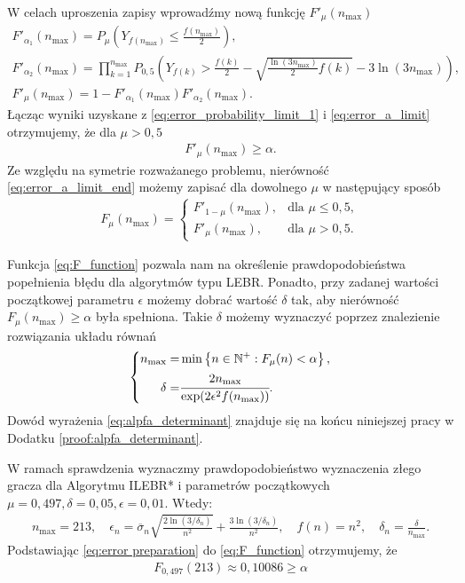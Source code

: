 \documentclass[inzynierska]{pwr_wmat_praca_dyplomowa}
\theoremstyle{plain}
\numberwithin{theorem}{chapter}
\theoremstyle{definition}
\numberwithin{theorem}{chapter}
\newcommand{\nmax}{n_{\text{max}}}
\begin{document}
	W celach uproszenia zapisy wprowadźmy nową funkcję  $F'_{\mu}(\nmax)$
	\begin{gather}
		F'_{\alpha_1}(\nmax) = P_{\mu}\left( Y_{f(\nmax)}  \le \frac{f(\nmax)}{2} \right), \\
		F'_{\alpha_2}(\nmax) = \prod_{k=1}^{\nmax} P_{0,5}\left( Y_{f(k)}  > \frac{f(k)}{2} - \sqrt{\frac{\ln(3\nmax)}{2}f(k)} - 3  \ln{(3 \nmax)}\right), \\
		\label{eq:error_a_limit}
		F'_{\mu}(\nmax) = 1 -F'_{\alpha_1}(\nmax)F'_{\alpha_2}(\nmax).
	\end{gather}
		Łącząc wyniki uzyskane z
		\eqref{eq:error_probability_limit_1} i \eqref{eq:error_a_limit} otrzymujemy, że dla $\mu > 0,5$
	\begin{gather}
		\label{eq:error_a_limit_end}
		F'_{\mu}(\nmax) \ge \alpha .
	\end{gather}
		Ze względu na symetrie rozważanego problemu, nierówność \eqref{eq:error_a_limit_end} możemy zapisać dla dowolnego $\mu$ w następujący sposób
	\begin{align}
		\label{eq:F_function}
		F_{\mu}(\nmax) = 
		\begin{cases}
			F'_{1-\mu}(\nmax), &\text{dla }  \mu\le0,5,\\
			F'_{\mu}(\nmax), &\text{dla } \mu>0,5.
		\end{cases}
	\end{align}
	
	Funkcja \eqref{eq:F_function} pozwala nam na określenie prawdopodobieństwa popełnienia błędu dla algorytmów typu LEBR. Ponadto, przy zadanej wartości początkowej parametru $\epsilon$ możemy dobrać wartość $\delta$ tak, aby nierówność $F_{\mu}(\nmax) \ge \alpha$ była spełniona. Takie $\delta$ możemy wyznaczyć poprzez znalezienie rozwiązania układu równań
	\begin{gather}
		\label{eq:alpfa_determinant}
		\left\{
		\begin{split}
			\nmax =& \min \left\{n\in \mathbb{N}^+: F_{\mu}(n) < \alpha \right\}, \\
			\delta =&\cfrac{2\nmax}{\exp(2\epsilon^2f(\nmax))}.
		\end{split}
		\right. 
	\end{gather}
	Dowód wyrażenia \eqref{eq:alpfa_determinant} znajduje się na końcu niniejszej pracy w Dodatku \ref{proof:alpfa_determinant}.
	
	W ramach sprawdzenia wyznaczmy prawdopodobieństwo wyznaczenia złego gracza dla Algorytmu ILEBR* i parametrów początkowych $\mu = 0,497, \delta=0,05, \epsilon=0,01$.
	Wtedy:
	\begin{gather}
		\label{eq:error preparation}
		\nmax = 213,\quad
		 \epsilon_n = \overline{\sigma}_n \sqrt{\frac{2\ln(3/\delta_n)}{n^2}} + \frac{3  \ln{(3 / \delta_n)}}{n^2},\quad
		  f(n) = n^2,\quad 
		  \delta_n = \frac{\delta}{\nmax}.
	\end{gather}
	Podstawiając \eqref{eq:error preparation} do \eqref{eq:F_function} otrzymujemy, że
	\begin{gather}
		\label{eq:alpha_result}
		F_{0,497}(213)  \approx 0,10086 \ge \alpha
	\end{gather}
\end{document}
